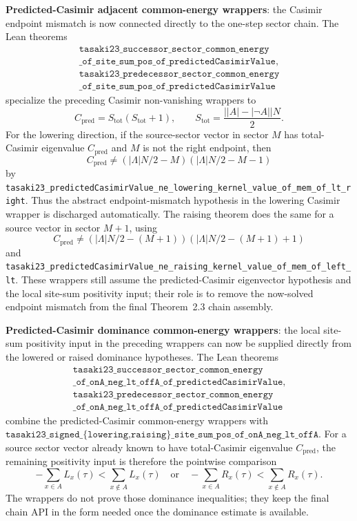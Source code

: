 \documentclass[a4paper,11pt]{article}
\begin{document}
\textbf{Predicted-Casimir adjacent common-energy wrappers}: the
Casimir endpoint mismatch is now connected directly to the one-step
sector chain.  The Lean theorems
\[
\begin{gathered}
\texttt{tasaki23\_successor\_sector\_common\_energy}\\
\texttt{\_of\_site\_sum\_pos\_of\_predictedCasimirValue},\\
\texttt{tasaki23\_predecessor\_sector\_common\_energy}\\
\texttt{\_of\_site\_sum\_pos\_of\_predictedCasimirValue}
\end{gathered}
\]
specialize the preceding Casimir non-vanishing wrappers to
\[
  C_{\mathrm{pred}}
  =
  S_{\mathrm{tot}}(S_{\mathrm{tot}}+1),
  \qquad
  S_{\mathrm{tot}}
  =
  \frac{\bigl||A|-|\neg A|\bigr|N}{2}.
\]
For the lowering direction, if the source-sector vector in sector
\(M\) has total-Casimir eigenvalue \(C_{\mathrm{pred}}\) and
\(M\) is not the right endpoint, then
\[
  C_{\mathrm{pred}}
  \ne
  (|\Lambda|N/2-M)(|\Lambda|N/2-M-1)
\]
by
\texttt{tasaki23\_predictedCasimirValue\_ne\_lowering\_kernel\_value\_of\_mem\_of\_lt\_right}.
Thus the abstract endpoint-mismatch hypothesis in the lowering
Casimir wrapper is discharged automatically.  The raising theorem does
the same for a source vector in sector \(M+1\), using
\[
  C_{\mathrm{pred}}
  \ne
  (|\Lambda|N/2-(M+1))(|\Lambda|N/2-(M+1)+1)
\]
and
\texttt{tasaki23\_predictedCasimirValue\_ne\_raising\_kernel\_value\_of\_mem\_of\_left\_lt}.
These wrappers still assume the predicted-Casimir eigenvector
hypothesis and the local site-sum positivity input; their role is to
remove the now-solved endpoint mismatch from the final Theorem~2.3
chain assembly.

\textbf{Predicted-Casimir dominance common-energy wrappers}: the
local site-sum positivity input in the preceding wrappers can now be
supplied directly from the lowered or raised dominance hypotheses.  The
Lean theorems
\[
\begin{gathered}
\texttt{tasaki23\_successor\_sector\_common\_energy}\\
\texttt{\_of\_onA\_neg\_lt\_offA\_of\_predictedCasimirValue},\\
\texttt{tasaki23\_predecessor\_sector\_common\_energy}\\
\texttt{\_of\_onA\_neg\_lt\_offA\_of\_predictedCasimirValue}
\end{gathered}
\]
combine the predicted-Casimir common-energy wrappers with
\(\texttt{tasaki23\_signed\_\{lowering,raising\}\_site\_sum\_pos\_of\_onA\_neg\_lt\_offA}\).
For a source sector vector already known to have total-Casimir
eigenvalue \(C_{\mathrm{pred}}\), the remaining positivity input is
therefore the pointwise comparison
\[
  -\sum_{x\in A} L_x(\tau) < \sum_{x\notin A} L_x(\tau)
  \quad\text{or}\quad
  -\sum_{x\in A} R_x(\tau) < \sum_{x\notin A} R_x(\tau).
\]
The wrappers do not prove those dominance inequalities; they keep the
final chain API in the form needed once the dominance estimate is
available.
\end{document}
